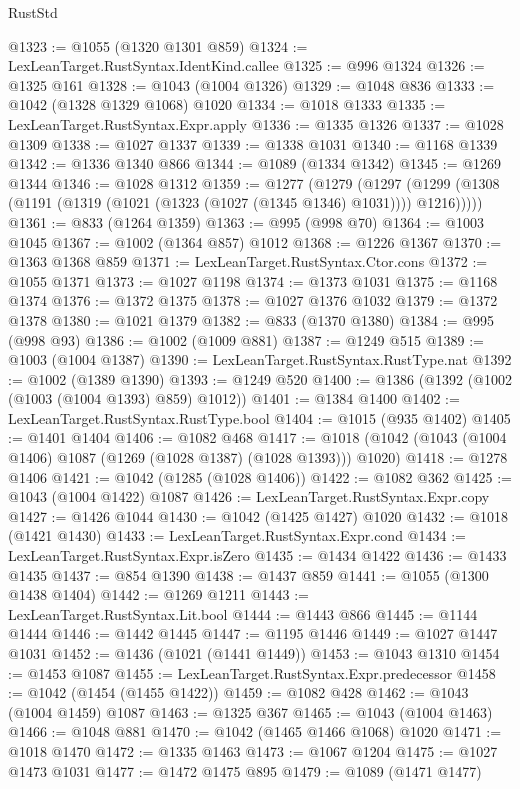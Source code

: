 \begin{lexlean}{RustStd}
\begin{coremodule}
@1323 := @1055 (@1320 @1301 @859)
@1324 := LexLeanTarget.RustSyntax.IdentKind.callee
@1325 := @996 @1324
@1326 := @1325 @161
@1328 := @1043 (@1004 @1326)
@1329 := @1048 @836
@1333 := @1042 (@1328 @1329 @1068) @1020
@1334 := @1018 @1333
@1335 := LexLeanTarget.RustSyntax.Expr.apply
@1336 := @1335 @1326
@1337 := @1028 @1309
@1338 := @1027 @1337
@1339 := @1338 @1031
@1340 := @1168 @1339
@1342 := @1336 @1340 @866
@1344 := @1089 (@1334 @1342)
@1345 := @1269 @1344
@1346 := @1028 @1312
@1359 := @1277
    (@1279
      (@1297 (@1299 (@1308 (@1191 (@1319 (@1021 (@1323 (@1027 (@1345 @1346) @1031)))) @1216)))))
@1361 := @833 (@1264 @1359)
@1363 := @995 (@998 @70)
@1364 := @1003 @1045
@1367 := @1002 (@1364 @857) @1012
@1368 := @1226 @1367
@1370 := @1363 @1368 @859
@1371 := LexLeanTarget.RustSyntax.Ctor.cons
@1372 := @1055 @1371
@1373 := @1027 @1198
@1374 := @1373 @1031
@1375 := @1168 @1374
@1376 := @1372 @1375
@1378 := @1027 @1376 @1032
@1379 := @1372 @1378
@1380 := @1021 @1379
@1382 := @833 (@1370 @1380)
@1384 := @995 (@998 @93)
@1386 := @1002 (@1009 @881)
@1387 := @1249 @515
@1389 := @1003 (@1004 @1387)
@1390 := LexLeanTarget.RustSyntax.RustType.nat
@1392 := @1002 (@1389 @1390)
@1393 := @1249 @520
@1400 := @1386 (@1392 (@1002 (@1003 (@1004 @1393) @859) @1012))
@1401 := @1384 @1400
@1402 := LexLeanTarget.RustSyntax.RustType.bool
@1404 := @1015 (@935 @1402)
@1405 := @1401 @1404
@1406 := @1082 @468
@1417 := @1018 (@1042 (@1043 (@1004 @1406) @1087 (@1269 (@1028 @1387) (@1028 @1393))) @1020)
@1418 := @1278 @1406
@1421 := @1042 (@1285 (@1028 @1406))
@1422 := @1082 @362
@1425 := @1043 (@1004 @1422) @1087
@1426 := LexLeanTarget.RustSyntax.Expr.copy
@1427 := @1426 @1044
@1430 := @1042 (@1425 @1427) @1020
@1432 := @1018 (@1421 @1430)
@1433 := LexLeanTarget.RustSyntax.Expr.cond
@1434 := LexLeanTarget.RustSyntax.Expr.isZero
@1435 := @1434 @1422
@1436 := @1433 @1435
@1437 := @854 @1390
@1438 := @1437 @859
@1441 := @1055 (@1300 @1438 @1404)
@1442 := @1269 @1211
@1443 := LexLeanTarget.RustSyntax.Lit.bool
@1444 := @1443 @866
@1445 := @1144 @1444
@1446 := @1442 @1445
@1447 := @1195 @1446
@1449 := @1027 @1447 @1031
@1452 := @1436 (@1021 (@1441 @1449))
@1453 := @1043 @1310
@1454 := @1453 @1087
@1455 := LexLeanTarget.RustSyntax.Expr.predecessor
@1458 := @1042 (@1454 (@1455 @1422))
@1459 := @1082 @428
@1462 := @1043 (@1004 @1459) @1087
@1463 := @1325 @367
@1465 := @1043 (@1004 @1463)
@1466 := @1048 @881
@1470 := @1042 (@1465 @1466 @1068) @1020
@1471 := @1018 @1470
@1472 := @1335 @1463
@1473 := @1067 @1204
@1475 := @1027 @1473 @1031
@1477 := @1472 @1475 @895
@1479 := @1089 (@1471 @1477)

\end{coremodule}
\end{lexlean}
